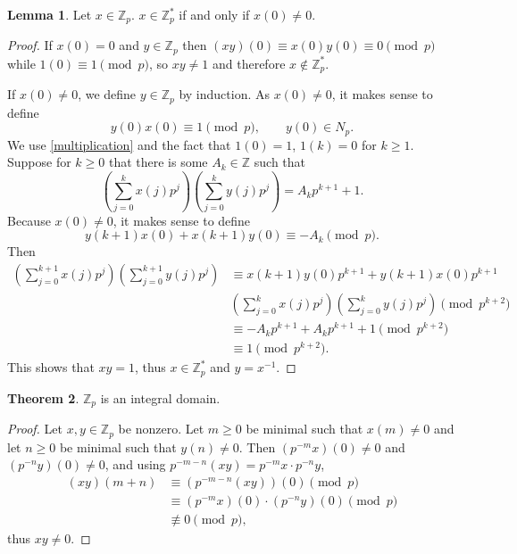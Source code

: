 \documentclass{article}
\theoremstyle{definition}
\newtheorem{theorem}{Theorem}
\newtheorem{lemma}[theorem]{Lemma}
\theoremstyle{definition}
\begin{document}
\begin{lemma}
Let $x \in \mathbb{Z}_p$. $x \in \mathbb{Z}_p^*$ if and only if $x(0) \neq 0$. 
\label{invertible}
\end{lemma}
\begin{proof}
If $x(0)=0$ and $y \in \mathbb{Z}_p$ then $(xy)(0) \equiv x(0) y(0)  \equiv 0 \pmod{p}$ while
$1(0) \equiv 1 \pmod{p}$, so $xy \neq 1$ and therefore $x \not \in \mathbb{Z}_p^*$.

If $x(0) \neq 0$, we define $y \in \mathbb{Z}_p$ by induction. As $x(0) \neq 0$, it makes sense to define 
\[
y(0) x(0) \equiv 1 \pmod{p},\qquad y(0) \in N_p.
\]
We use \eqref{multiplication} and the fact that $1(0)=1$, $1(k)=0$ for $k \geq 1$. Suppose for $k \geq 0$ that 
there is some $A_k \in \mathbb{Z}$ such that
\[
 \left( \sum_{j=0}^k x(j) p^j \right) \left( \sum_{j=0}^k y(j) p^j\right) = A_k p^{k+1} + 1.
\]
Because $x(0) \neq 0$, it makes sense to define
\[
y(k+1)x(0) + x(k+1)y(0) \equiv -A_k \pmod{p}.
\]
Then
\begin{align*}
 \left( \sum_{j=0}^{k+1} x(j) p^j \right) \left( \sum_{j=0}^{k+1} y(j) p^j\right) &\equiv 
x(k+1)y(0)p^{k+1}+y(k+1)x(0)p^{k+1}\\
& \left( \sum_{j=0}^{k} x(j) p^j \right) \left( \sum_{j=0}^{k} y(j) p^j\right) \pmod{p^{k+2}}\\
&\equiv -A_k p^{k+1}+ A_k p^{k+1} + 1 \pmod{p^{k+2}}\\
&\equiv 1 \pmod{p^{k+2}}.
\end{align*}
This shows that $xy = 1$, thus $x \in \mathbb{Z}_p^*$ and $y = x^{-1}$.
\end{proof}



\begin{theorem}
$\mathbb{Z}_p$ is an integral domain.
\end{theorem}
\begin{proof}
Let $x,y \in \mathbb{Z}_p$ be nonzero. Let $m \geq 0$ be minimal such that $x(m) \neq 0$ and let $n \geq 0$ be minimal such that $y(n) \neq 0$.
Then $(p^{-m}x)(0) \neq 0$ and $(p^{-n}y)(0) \neq 0$, and using
$p^{-m-n} (xy) = p^{-m} x \cdot p^{-n} y$,
\begin{align*}
(xy)(m+n) &\equiv 
(p^{-m-n} (xy))(0) \pmod{p}\\
&\equiv (p^{-m} x)(0)  \cdot (p^{-n} y)(0) \pmod{p}\\
&\not \equiv 0 \pmod{p},
\end{align*}
thus $xy \neq 0$.
\end{proof}
\end{document}
